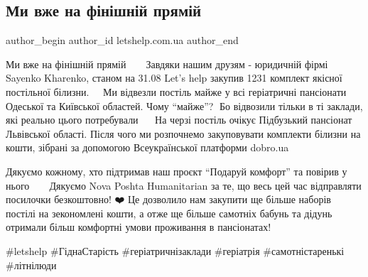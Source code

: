  
 
 
 
 

\subsection{Ми вже на фінішній прямій}
\label{sec:31_08_2023.fb.letshelp.com.ua.1.my_vzhe_na_finishnij_prjamij}

\ifcmt
 author_begin
   author_id letshelp.com.ua
 author_end
\fi

Ми вже на фінішній прямій 💪
⠀
Завдяки нашим друзям - юридичній фірмі Sayenko Kharenko, станом на 31.08 Let's
help закупив 1231 комплект якісної постільної білизни.
⠀
Ми відвезли постіль майже у всі геріатричні пансіонати 👵🏻👨🏻🦳Одеської та
Київської областей. Чому \enquote{майже}? 🤔Бо відвозили тільки в ті заклади, які
реально цього потребували🙏
⠀
На черзі постіль очікує Підбузький пансіонат Львівської області. Після чого ми
розпочнемо закуповувати комплекти білизни на кошти, зібрані за допомогою
Всеукраїнської платформи dobro.ua ⠀

Дякуємо кожному, хто підтримав наш проєкт \enquote{Подаруй комфорт} та повірив у нього 💛
⠀
Дякуємо Nova Poshta Humanitarian за те, що весь цей час відправляти посилочки
безкоштовно! ❤️ Це дозволило нам закупити ще більше наборів постілі на
зекономлені кошти, а отже ще більше самотніх бабунь та дідунь отримали більш
комфортні умови проживання в пансіонатах!👵🏻👨🏻🦳 ⠀

\#letshelp \#ГіднаСтарість \#геріатричнізаклади \#геріатрія \#самотністаренькі \#літнілюди
